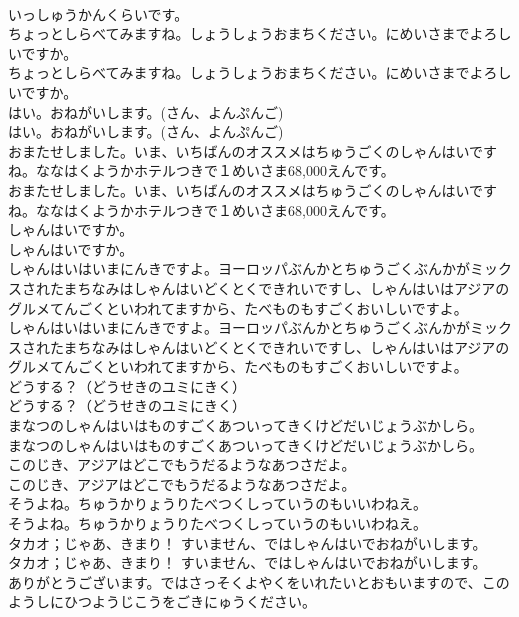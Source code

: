 \documentclass[8pt]{extreport}
\begin{document}
\begin{CJK}{UTF8}{min}
\\	いっしゅうかんくらいです。
\\	ちょっとしらべてみますね。しょうしょうおまちください。にめいさまでよろしいですか。
\\	ちょっとしらべてみますね。しょうしょうおまちください。にめいさまでよろしいですか。
\\	はい。おねがいします。(さん、よんぷんご)
\\	はい。おねがいします。(さん、よんぷんご)
\\	おまたせしました。いま、いちばんのオススメはちゅうごくのしゃんはいですね。ななはくようかホテルつきで１めいさま68,000えんです。
\\	おまたせしました。いま、いちばんのオススメはちゅうごくのしゃんはいですね。ななはくようかホテルつきで１めいさま68,000えんです。
\\	しゃんはいですか。
\\	しゃんはいですか。
\\	しゃんはいはいまにんきですよ。ヨーロッパぶんかとちゅうごくぶんかがミックスされたまちなみはしゃんはいどくとくできれいですし、しゃんはいはアジアのグルメてんごくといわれてますから、たべものもすごくおいしいですよ。
\\	しゃんはいはいまにんきですよ。ヨーロッパぶんかとちゅうごくぶんかがミックスされたまちなみはしゃんはいどくとくできれいですし、しゃんはいはアジアのグルメてんごくといわれてますから、たべものもすごくおいしいですよ。
\\	どうする？（どうせきのユミにきく）
\\	どうする？（どうせきのユミにきく）
\\	まなつのしゃんはいはものすごくあついってきくけどだいじょうぶかしら。
\\	まなつのしゃんはいはものすごくあついってきくけどだいじょうぶかしら。
\\	このじき、アジアはどこでもうだるようなあつさだよ。
\\	このじき、アジアはどこでもうだるようなあつさだよ。
\\	そうよね。ちゅうかりょうりたべつくしっていうのもいいわねえ。
\\	そうよね。ちゅうかりょうりたべつくしっていうのもいいわねえ。
\\	タカオ；じゃあ、きまり！ すいません、ではしゃんはいでおねがいします。
\\	タカオ；じゃあ、きまり！ すいません、ではしゃんはいでおねがいします。
\\	ありがとうございます。ではさっそくよやくをいれたいとおもいますので、このようしにひつようじこうをごきにゅうください。

\end{CJK}
\end{document}
